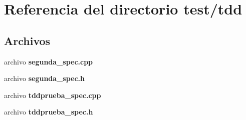 \section{Referencia del directorio test/tdd}
\label{dir_412646118a3c96d4e03df008b7040ce8}
\subsection*{Archivos}
\begin{DoxyCompactItemize}
\item 
archivo {\bf segunda\+\_\+spec.\+cpp}
\item 
archivo {\bf segunda\+\_\+spec.\+h}
\item 
archivo {\bf tddprueba\+\_\+spec.\+cpp}
\item 
archivo {\bf tddprueba\+\_\+spec.\+h}
\end{DoxyCompactItemize}
